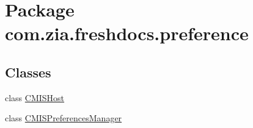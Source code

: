 \hypertarget{namespacecom_1_1zia_1_1freshdocs_1_1preference}{\section{Package com.\-zia.\-freshdocs.\-preference}
\label{namespacecom_1_1zia_1_1freshdocs_1_1preference}
}
\subsection*{Classes}
\begin{DoxyCompactItemize}
\item 
class \hyperlink{classcom_1_1zia_1_1freshdocs_1_1preference_1_1_c_m_i_s_host}{C\-M\-I\-S\-Host}
\item 
class \hyperlink{classcom_1_1zia_1_1freshdocs_1_1preference_1_1_c_m_i_s_preferences_manager}{C\-M\-I\-S\-Preferences\-Manager}
\end{DoxyCompactItemize}
